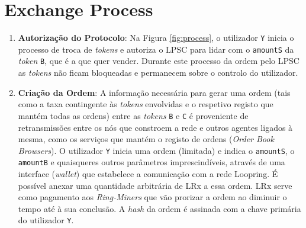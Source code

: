 \documentclass[UTF8,nofonts]{article}
\begin{document}
\begin{multicols}{2}
\begin{itemize}
\end{itemize}

\section{Exchange Process\label{sec:process}}

\begin{enumerate} 





\item \textbf{Autorização do Protocolo}: Na Figura \ref{fig:process}, o utilizador \verb|Y| inicia o processo de troca de \textit{tokens} e autoriza 
o LPSC para lidar com o \verb|amountS| da \textit{token} \verb|B|, que é a que quer vender. Durante este processo da ordem pelo LPSC as \textit{tokens} não ficam bloqueadas e permanecem 
sobre o controlo do utilizador.





\item \textbf{Criação da Ordem}: A informação necessária para gerar uma ordem (tais como a taxa contingente às \textit{tokens} envolvidas e
o respetivo registo que mantém todas as ordens) entre as \textit{tokens} \verb|B| e \verb|C| é proveniente de retransmissões entre os nós
que constroem a rede e outros agentes ligados à mesma, como os serviços que mantém o registo de ordens (\textit{Order Book Browsers}). O
utilizador \verb|Y| inicia uma ordem (limitada) e indica o \verb|amountS|, o \verb|amountB| e quaisqueres outros parâmetros imprescindíveis,
através de uma interface (\textit{wallet}) que estabelece a comunicação com a rede Loopring. É possível anexar uma quantidade arbitrária de
LRx a essa ordem. LRx serve como pagamento aos \textit{Ring-Miners} que vão prorizar a ordem ao diminuir o tempo até à sua conclusão. A
\textit{hash} da ordem é assinada com a chave primária do utilizador \verb|Y|.


\end{enumerate}
\end{multicols}
\end{document}
